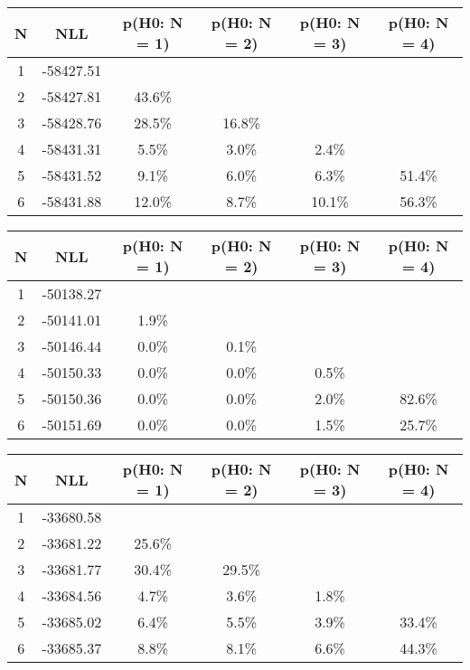 \begin{table}[htb]
	\begin{center}
{\footnotesize\renewcommand{\arraystretch}{1.4}
		\begin{tabular}{cc||cccc}
			N & NLL & p(H0: N = 1) & p(H0: N = 2) & p(H0: N = 3) & p(H0: N = 4)\\ 
		\hline
1 & -58427.51 & & & & \\
2 & -58427.81 & 43.6\% & & & \\
3 & -58428.76 & 28.5\% & 16.8\% & & \\
4 & -58431.31 & 5.5\% & 3.0\% & 2.4\% & \\
5 & -58431.52 & 9.1\% & 6.0\% & 6.3\% & 51.4\% \\
6 & -58431.88 & 12.0\% & 8.7\% & 10.1\% & 56.3\% \\
	\end{tabular}
		\label{tab:lab}
	}
	\end{center}\end{table}

\begin{table}[htb]
	\begin{center}
{\footnotesize\renewcommand{\arraystretch}{1.4}
		\begin{tabular}{cc||cccc}
			N & NLL & p(H0: N = 1) & p(H0: N = 2) & p(H0: N = 3) & p(H0: N = 4)\\ 
		\hline
1 & -50138.27 & & & & \\
2 & -50141.01 & 1.9\% & & & \\
3 & -50146.44 & 0.0\% & 0.1\% & & \\
4 & -50150.33 & 0.0\% & 0.0\% & 0.5\% & \\
5 & -50150.36 & 0.0\% & 0.0\% & 2.0\% & 82.6\% \\
6 & -50151.69 & 0.0\% & 0.0\% & 1.5\% & 25.7\% \\
	\end{tabular}
		\label{tab:lab}
	}
	\end{center}\end{table}

\begin{table}[htb]
	\begin{center}
{\footnotesize\renewcommand{\arraystretch}{1.4}
		\begin{tabular}{cc||cccc}
			N & NLL & p(H0: N = 1) & p(H0: N = 2) & p(H0: N = 3) & p(H0: N = 4)\\ 
		\hline
1 & -33680.58 & & & & \\
2 & -33681.22 & 25.6\% & & & \\
3 & -33681.77 & 30.4\% & 29.5\% & & \\
4 & -33684.56 & 4.7\% & 3.6\% & 1.8\% & \\
5 & -33685.02 & 6.4\% & 5.5\% & 3.9\% & 33.4\% \\
6 & -33685.37 & 8.8\% & 8.1\% & 6.6\% & 44.3\% \\
	\end{tabular}
		\label{tab:lab}
	}
	\end{center}\end{table}

